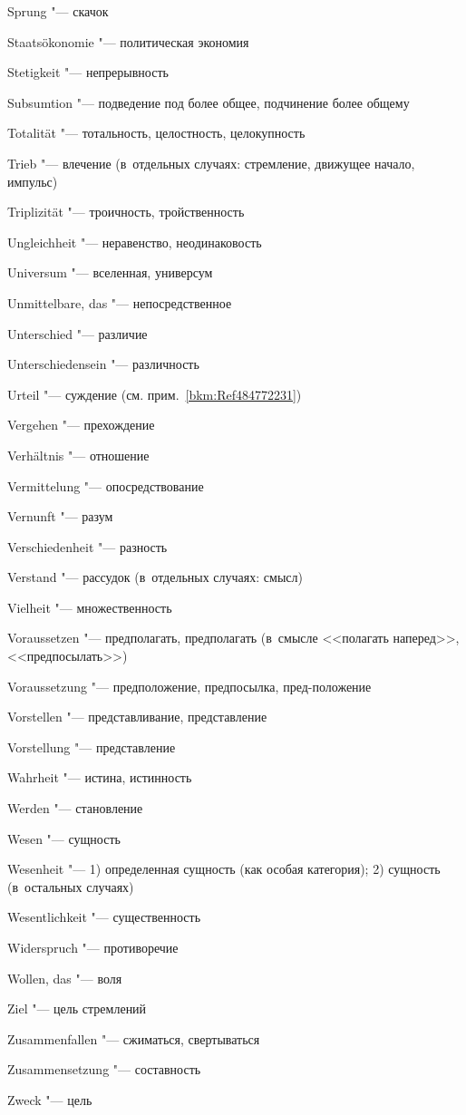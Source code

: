 \begin{multicols}{2}
Sprung "--- скачок

Staats\-ökonomie "--- политическая экономия

Stetigkeit "--- непрерывность

Subsumtion "--- подведение под более общее, подчинение более общему

\bigskip

Totalität "--- тотальность, целостность, целокупность

Trieb "--- влечение (в~отдельных случаях: стремление, движущее начало, импульс)

Triplizität "--- троичность, тройственность

\bigskip

Ungleichheit "--- неравенство, неодинаковость

Universum "--- вселенная, универсум

Unmittelbare, das "--- непосредственное

Unterschied "--- различие

Unterschie\-densein "--- различность

Urteil "--- суждение (см. прим.~\ref{bkm:Ref484772231})

\bigskip

Vergehen "--- прехождение

Verhältnis "--- отношение

Vermittelung "--- опосредствование

Vernunft "--- разум

Verschieden\-heit "--- разность

Verstand "--- рассудок (в~отдельных случаях: смысл)

Vielheit "--- множественность

Voraussetzen "--- предполагать, предполагать (в~смысле <<полагать
наперед>>, <<предпосылать>>)

Voraussetzung "--- предположение, предпосылка, пред-положение

Vorstellen "--- представливание, представление

Vorstellung "--- представление

\bigskip

Wahrheit "--- истина, истинность

Werden "--- становление

Wesen "--- сущность

Wesenheit "--- 1) определенная сущность (как особая категория);
2) сущность (в~остальных случаях)

Wesentlich\-keit "--- существенность

Widerspruch "--- противоречие

Wollen, das "--- воля

\bigskip

Ziel "--- цель стремлений

Zusammen\-fallen "--- сжиматься, свертываться

Zusammen\-setzung "--- составность

Zweck "--- цель
\end{multicols}

